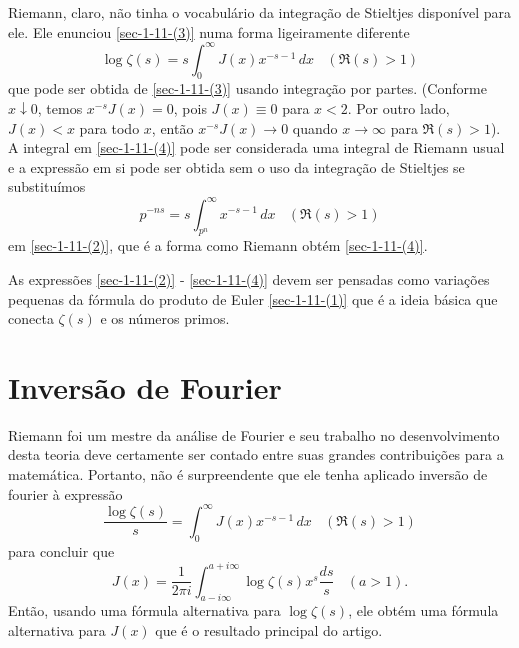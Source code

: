     Riemann, claro, não tinha o vocabulário da integração de Stieltjes disponível para ele. Ele enunciou \eqref{sec-1-11-(3)} numa forma ligeiramente diferente
    \begin{equation}
        \label{sec-1-11-(4)}
        \log \zeta(s) = s\int_{0}^{\infty} J(x)x^{-s-1} \, dx \ \ \ \ (\Re(s)>1)
    \end{equation}
    que pode ser obtida de \eqref{sec-1-11-(3)} usando integração por partes. (Conforme $x \downarrow 0$, temos $x^{-s}J(x) = 0$, pois $J(x) \equiv 0$ para $x<2$. Por outro lado, $J(x) < x$ para todo $x$, então $x^{-s}J(x) \to 0$ quando $x \to \infty$ para $\Re(s) > 1$). A integral em \eqref{sec-1-11-(4)} pode ser considerada uma integral de Riemann usual e a expressão em si pode ser obtida sem o uso da integração de Stieltjes se substituímos
    \begin{equation*}
        \label{sec-1-11-(4)}
        p^{-ns} = s\int_{p^n}^{\infty} x^{-s-1} \, dx \ \ \ \ (\Re(s)>1)
    \end{equation*}
    em \eqref{sec-1-11-(2)}, que é a forma como Riemann obtém \eqref{sec-1-11-(4)}.
    
    As expressões \eqref{sec-1-11-(2)} - \eqref{sec-1-11-(4)} devem ser pensadas como variações pequenas da fórmula do produto de Euler \eqref{sec-1-11-(1)} que é a ideia básica que conecta $\zeta(s)$ e os números primos.
    
    
    \section{Inversão de Fourier}
    
    
    Riemann foi um mestre da análise de Fourier e seu trabalho no desenvolvimento desta teoria deve certamente ser contado entre suas grandes contribuições para a matemática. Portanto, não é surpreendente que ele tenha aplicado inversão de fourier à expressão
    \begin{equation}
        \label{sec-1-12-(1)} 
        \frac{\log \zeta(s)}{s} = \int_{0}^{\infty} J(x) x^{-s-1} \, dx \ \ \ \ (\Re(s) > 1)
    \end{equation}
    para concluir que 
    \begin{equation}
        \label{sec-1-12-(2)} 
        J(x) = \frac{1}{2\pi i} \int_{a - i \infty}^{a + i\infty} \log \zeta(s) x^{s} \frac{ds}{s} \ \ \ \ (a > 1).
    \end{equation}
    Então, usando uma fórmula alternativa para $\log \zeta(s)$, ele obtém uma fórmula alternativa para $J(x)$ que é o resultado principal do artigo.
    

